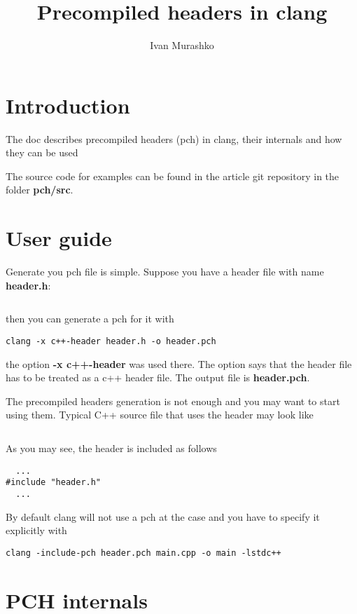 \documentclass[14pt,a4paper]{article}
\title{Precompiled headers in clang}
\author{Ivan Murashko}
\date{}
\begin{document}
\maketitle
\tableofcontents

\section*{Introduction}
The doc describes precompiled headers (pch) in clang, their internals and
how they can be used

The source code for examples can be found in the article git
repository \cite{github:articles_ivanmurashko} in the folder 
\textbf{pch/src}.

\section{User guide}
Generate you pch file is simple. Suppose you have a header file with
name \textbf{header.h}:
\inputminted{c++}{./src/simple/header.h} then you can generate a pch for it with
\begin{verbatim}
clang -x c++-header header.h -o header.pch
\end{verbatim}
the option \textbf{-x c++-header} was used there. The option says that
the header file has to be treated as a c++ header file. The output
file is \textbf{header.pch}.

The precompiled headers generation is not enough and you may want to
start using them. Typical C++ source file that uses the header may
look like
\inputminted{c++}{./src/simple/main.cpp}
As you may see, the header is included as follows
\begin{verbatim}
  ...
#include "header.h"
  ...
\end{verbatim}
By default clang will not use a pch at the case and you have to
specify it explicitly with
\begin{verbatim}
clang -include-pch header.pch main.cpp -o main -lstdc++
\end{verbatim}


\section{PCH internals}

  
     
\end{document}
